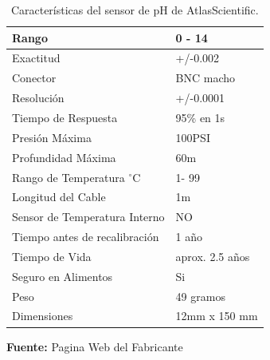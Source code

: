 \begin{table}[H]
\protect\caption[Características del sensor de pH de AtlasScientific]{Características del sensor de pH de AtlasScientific.}
\label{tab: caract_sondaph}
\begin{center}
\begin{tabular}{|l|l|}
\hline
Rango    &  0 - 14\\
\hline
Exactitud      &  +/-0.002\\
\hline
Conector &  BNC macho\\
\hline
Resolución   &  +/-0.0001\\
\hline
Tiempo de Respuesta   &  95\% en 1s\\
\hline
Presión Máxima    &  100PSI\\
\hline
Profundidad Máxima	& 60m\\
\hline
Rango de Temperatura $^{\circ}$C	& 1- 99\\
\hline
Longitud del Cable	& 1m\\
\hline
Sensor de Temperatura Interno	& NO\\
\hline
Tiempo antes de recalibración	& 1 año\\
\hline
Tiempo de Vida	& aprox. 2.5 años\\
\hline
Seguro en Alimentos & Si\\
\hline
Peso & 49 gramos\\
\hline
Dimensiones & 12mm x 150 mm\\
\hline
\end{tabular}
\vspace{5mm}
\newline
\hfill
\textbf{Fuente: }Pagina Web del Fabricante\cite{atlasph}
\end{center}
\end{table} 


